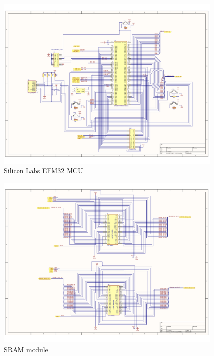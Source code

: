 \begin{figure}
    \includegraphics[width=\paperwidth, angle=90]{img/MCU_EFM32.pdf}
    \caption{Silicon Labs EFM32 MCU}
    \label{fig:MCU_EFM32}
\end{figure}

\begin{figure}
    \includegraphics[width=\paperwidth, angle=90]{img/RAM_module.pdf}
    \caption{SRAM module}
    \label{fig:RAM_module}
\end{figure}


